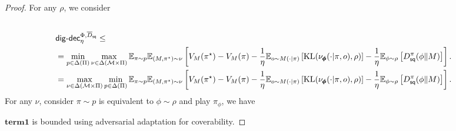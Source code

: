 \iffalse
\begin{proof}
For any $\rho$, we consider
\begin{align*}
    \\&\mathsf{dig}\text{-}\mathsf{dec}_\eta^{\Phi,\overline{D}_{\mathsf{sq}}} \le
    \\&= \min_{p \in \Delta(\Pi)}\max_{\nu \in \Delta(\mathcal{M} \times \Pi)} \mathbb{E}_{\pi\sim p}\mathbb{E}_{(M, \pi^\star) \sim \nu}\left[ V_M(\pi^\star) - V_M(\pi) - \frac{1}{\eta}\mathbb{E}_{o\sim M(\cdot|\pi)}\left[\text{KL}(\nu_{\pmb{\phi}}(\cdot|\pi, o), \rho)\right] - \frac{1}{\eta} \mathbb{E}_{\phi\sim \rho}\left[D_{\mathsf{sq}}^\pi(\phi\|M)\right]  \right].  
    \\&= \max_{\nu \in \Delta(\mathcal{M} \times \Pi)}\min_{p \in \Delta(\Pi)} \mathbb{E}_{\pi\sim p}\mathbb{E}_{(M, \pi^\star) \sim \nu}\left[ V_M(\pi^\star) - V_M(\pi) - \frac{1}{\eta}\mathbb{E}_{o\sim M(\cdot|\pi)}\left[\text{KL}(\nu_{\pmb{\phi}}(\cdot|\pi, o), \rho)\right] - \frac{1}{\eta} \mathbb{E}_{\phi\sim \rho}\left[D_{\mathsf{sq}}^\pi(\phi\|M)\right]  \right].  
\end{align*}
For any $\nu$, consider $\pi \sim p$ is equivalent to $\phi \sim \rho$ and play $\pi_{\phi}$, we have

$\textbf{term1}$ is bounded using adversarial adaptation for coverability.


\end{proof}
